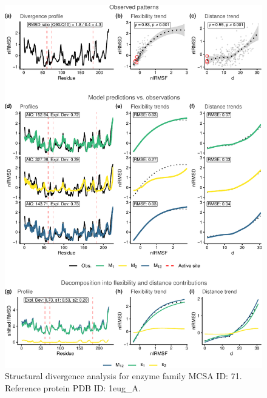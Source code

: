\documentclass[
]{article}
\begin{document}
\clearpage
\begin{figure}[H]
\centering


\begin{center}\includegraphics{supplementary_material_files/figure-latex/generate_figures-3} \end{center}

\caption{Structural divergence analysis for enzyme family MCSA ID: 71. Reference protein PDB ID: 1eug\_A.}
\end{figure}
\end{document}
